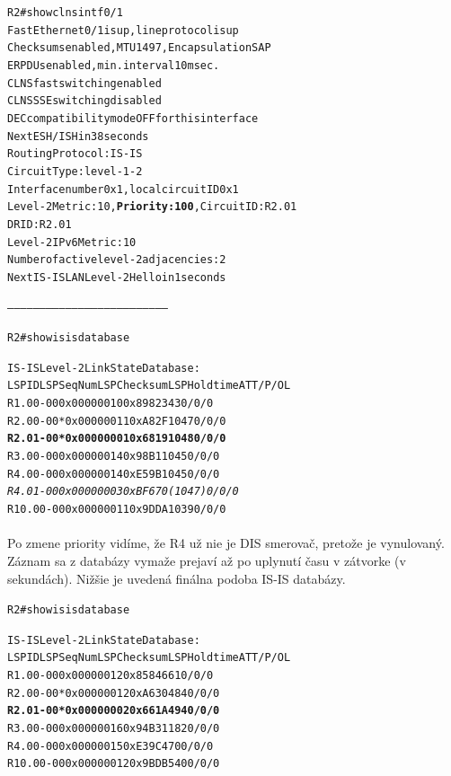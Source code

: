 \documentclass[12pt,twoside,a4paper]{report}
\begin{document}
\noindent
{\selectfont
\begin{small}
\begin{alltt}

R2#show clns int f0/1
FastEthernet0/1 is up, line protocol is up
  Checksums enabled, MTU 1497, Encapsulation SAP
  ERPDUs enabled, min. interval 10 msec.
  CLNS fast switching enabled
  CLNS SSE switching disabled
  DEC compatibility mode OFF for this interface
  Next ESH/ISH in 38 seconds
  Routing Protocol: IS-IS
    Circuit Type: level-1-2
    Interface number 0x1, local circuit ID 0x1
    Level-2 Metric: 10, \textbf{Priority: 100}, Circuit ID: R2.01
    DR ID: R2.01
    Level-2 IPv6 Metric: 10
    Number of active level-2 adjacencies: 2
    Next IS-IS LAN Level-2 Hello in 1 seconds


--------------------------------------------------------------------------


R2#show isis database

IS-IS Level-2 Link State Database:
LSPID                 LSP Seq Num  LSP Checksum  LSP Holdtime      ATT/P/OL
R1.00-00              0x00000010   0x8982        343               0/0/0
R2.00-00            * 0x00000011   0xA82F        1047              0/0/0
\textbf{R2.01-00            * 0x00000001   0x6819        1048              0/0/0}
R3.00-00              0x00000014   0x98B1        1045              0/0/0
R4.00-00              0x00000014   0xE59B        1045              0/0/0
\textit{R4.01-00              0x00000003   0xBF67        0 (1047)          0/0/0}
R10.00-00             0x00000011   0x9DDA        1039              0/0/0
\end{alltt}
\end{small}
}

\paragraph{}
Po zmene priority vidíme, že R4 už nie je DIS smerovač, pretože  je vynulovaný. Záznam sa z databázy vymaže prejaví až po uplynutí času v zátvorke (v sekundách). Nižšie je uvedená finálna podoba IS-IS databázy.

\noindent
{\selectfont
\begin{small}
\begin{alltt}
R2#show isis database

IS-IS Level-2 Link State Database:
LSPID                 LSP Seq Num  LSP Checksum  LSP Holdtime      ATT/P/OL
R1.00-00              0x00000012   0x8584        661               0/0/0
R2.00-00            * 0x00000012   0xA630        484               0/0/0
\textbf{R2.01-00            * 0x00000002   0x661A        494               0/0/0}
R3.00-00              0x00000016   0x94B3        1182              0/0/0
R4.00-00              0x00000015   0xE39C        470               0/0/0
R10.00-00             0x00000012   0x9BDB        540               0/0/0
\end{alltt}
\end{small}
}
\end{document}
